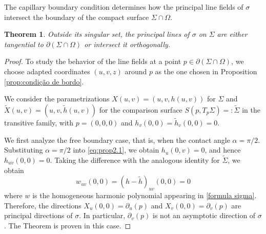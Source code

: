 \documentclass[11pt,reqno]{amsart}
\newtheorem{theorem}{Theorem}[section]
\begin{document}
The capillary boundary condition determines how the principal line fields of $\sigma$ intersect the boundary of the compact surface $\Sigma\cap \Omega$.
\begin{theorem}\label{thm: mainA}
     Outside its singular set, the principal lines of $\sigma$ on $\Sigma$ are either tangential to $\partial(\Sigma\cap \Omega)$ or intersect it orthogonally.
\end{theorem}
\begin{proof} To study the behavior of the line fields at a point $p\in \partial (\Sigma\cap\Omega)$, we choose adapted coordinates $(u,v,z)$ around $p$ as the one chosen in Proposition \ref{prop:condição de bordo}.


We consider the parametrizations $X(u,v)=(u,v,h(u,v))$ for $\Sigma$ and $\widetilde{X}(u,v)=(u,v,\widetilde{h}(u,v))$ for the comparison surface $S(p,T_p\Sigma)=:\widetilde{\Sigma}$ in the transitive family, with $p=(0,0,0)$ and $h_v(0,0)=\widetilde{h}_v(0,0)=0$.

We first analyze the free boundary case, that is, when the contact angle $\alpha=\pi/2$. Substituting $\alpha=\pi/2$ into \eqref{eq:prop2.1}, we obtain $h_u(0,v)=0$, and hence $h_{uv}(0,0)=0$. %
Taking the difference with the analogous identity for $\widetilde{\Sigma}$, we obtain
\begin{equation*}
    w_{uv}(0,0)=(h-\widetilde{h})_{uv}(0,0)=0
\end{equation*}
where $w$ is the homogeneous harmonic polynomial appearing in \eqref{formula sigma}. Therefore, the directions $X_u(0,0)=\partial_u(p)$ and $X_v(0,0)=\partial_v(p)$ are principal directions of $\sigma$. In particular, $\partial_v(p)$ is not an asymptotic direction of $\sigma$.  The Theorem is proven in this case.


\end{proof}
\end{document}
